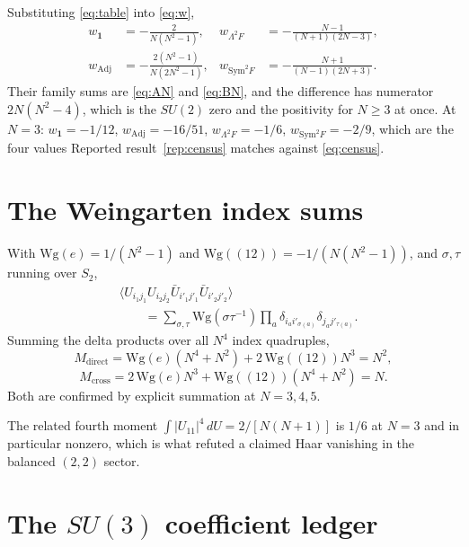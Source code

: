 \documentclass[11pt]{article}
\theoremstyle{plain}
\theoremstyle{definition}
\theoremstyle{remark}
\newcommand{\chk}[1]{}
\begin{document}
Substituting \eqref{eq:table} into \eqref{eq:w},
\begingroup\small
\begin{align*}
  w_{\mathbf 1}&=-\frac{2}{N(N^2-1)}, &
  w_{\Lambda^2F}&=-\frac{N-1}{(N+1)(2N-3)},\\
  w_{\mathrm{Adj}}&=-\frac{2(N^2-1)}{N(2N^2-1)}, &
  w_{\mathrm{Sym}^2F}&=-\frac{N+1}{(N-1)(2N+3)} .
\end{align*}
\endgroup
Their family sums are \eqref{eq:AN} and \eqref{eq:BN}, and the difference has
numerator $2N(N^2-4)$, which is the $SU(2)$ zero and the positivity for
$N\ge3$ at once.
\chk{the four channel weights follow from dimension and Casimir} At $N=3$:
$w_{\mathbf 1}=-1/12$, $w_{\mathrm{Adj}}=-16/51$, $w_{\Lambda^2F}=-1/6$,
$w_{\mathrm{Sym}^2F}=-2/9$, which are the four values
Reported result~\ref{rep:census} matches against \eqref{eq:census}.

\section{The Weingarten index sums}\label{app:wg}

With $\mathrm{Wg}(e)=1/(N^2-1)$ and $\mathrm{Wg}((12))=-1/(N(N^2-1))$, and
$\sigma,\tau$ running over $S_2$,
\[
  \begin{aligned}
    &\bigl\langle U_{i_1j_1}U_{i_2j_2}
       \bar U_{i'_1j'_1}\bar U_{i'_2j'_2}\bigr\rangle\\
    &\qquad=\sum_{\sigma,\tau}\mathrm{Wg}(\sigma\tau^{-1})
      \prod_a \delta_{i_ai'_{\sigma(a)}}\delta_{j_aj'_{\tau(a)}} .
  \end{aligned}
\]
Summing the delta products over all $N^4$ index quadruples,
\[
  M_{\mathrm{direct}}=\mathrm{Wg}(e)(N^4+N^2)+2\,\mathrm{Wg}((12))N^3=N^2,
\]
\[
  M_{\mathrm{cross}}=2\,\mathrm{Wg}(e)N^3+\mathrm{Wg}((12))(N^4+N^2)=N .
\]
Both are confirmed by explicit summation at $N=3,4,5$.
\chk{the shared-link weights are Weingarten, not an isotropy assumption}
The related fourth moment $\int|U_{11}|^4\,dU=2/[N(N+1)]$ is $1/6$ at $N=3$ and in particular
nonzero, which is what refuted a claimed Haar vanishing in the balanced
$(2,2)$ sector.
\chk{SU(3) Weingarten values follow from the general formula}
\chk{the fourth moment integral |U\_11|\^{}4 = 1/6 at N = 3}

\section{The \texorpdfstring{$SU(3)$}{SU(3)} coefficient ledger}\label{app:ledger}
\end{document}
